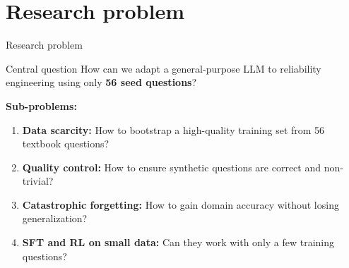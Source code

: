 \documentclass[aspectratio=169,10pt]{beamer}
\begin{document}
\section{Research problem}
\begin{frame}{Research problem}
\begin{alertblock}{Central question}
  How can we adapt a general-purpose LLM to reliability engineering using only \textbf{56 seed questions}?
\end{alertblock}

\vspace{0.5em}
\textbf{Sub-problems:}
\begin{enumerate}
  \item \textbf{Data scarcity:} How to bootstrap a high-quality training set from 56 textbook questions?
  \item \textbf{Quality control:} How to ensure synthetic questions are correct and non-trivial?
  \item \textbf{Catastrophic forgetting:} How to gain domain accuracy without losing generalization?
  \item \textbf{SFT and RL on small data:} Can they work with only a few training questions?
\end{enumerate}
\end{frame}

\end{document}
